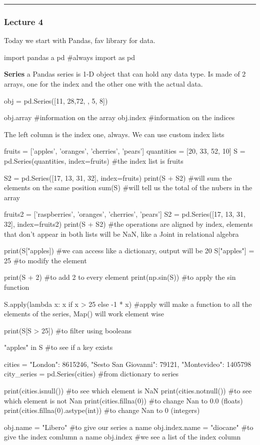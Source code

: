 \hrule
\subsubsection{Lecture 4}

Today we start with Pandas, fav library for data.

\begin{pythoncode}
    import pandas a pd #always import as pd
\end{pythoncode}

\textbf{Series} \ra a Pandas series is 1-D object that can hold any data type. Is made of 2 arrays, one for the index and the other one with the actual data.

\begin{pythoncode}
    obj = pd.Series([11, 28,72, , 5, 8])

    obj.array #information on the array
    obj.index #information on the indices
\end{pythoncode}

The left column is the index one, always. We can use custom index lists

\begin{pythoncode}
    fruits = ['apples', 'oranges', 'cherries', 'pears']
    quantities = [20, 33, 52, 10]
    S = pd.Series(quantities, index=fruits)
    #the index list is fruits

    S2 = pd.Series([17, 13, 31, 32], index=fruits)
    print(S + S2) #will sum the elements on the same position
    sum(S) #will tell us the total of the nubers in the array

    fruits2 = ['raspberries', 'oranges', 'cherries', 'pears']
    S2 = pd.Series([17, 13, 31, 32], index=fruits2)
    print(S + S2) #the operations are aligned by index, elements that don't appear in both lists will be NaN, like a Joint in relational algebra

    print(S["apples]) #we can access like a dictionary, output will be 20
    S["apples"] = 25 #to modify the element

    print(S + 2) #to add 2 to every element
    print(np.sin(S)) #to apply the sin function

    S.apply(lambda x: x if x > 25 else -1 * x) #apply will make a function to all the elements of the series, Map() will work element wise

    print(S[S > 25]) #to filter using booleans

    "apples" in S #to see if a key exists

    cities = {"London": 8615246,
    "Sesto San Giovanni": 79121,
    "Montevideo": 1405798}
    city_series = pd.Series(cities) #from dictionary to series

    print(cities.isnull()) #to see which element is NaN
    print(cities.notnull()) #to see which element is not Nan
    print(cities.fillna(0)) #to change Nan to 0.0 (floats)
    print(cities.fillna(0).astype(int)) #to change Nan to 0 (integers)

    obj.name = "Libero" #to give our series a name
    obj.index.name = "diocane" #to give the index comlumn a name
    obj.index #we see a list of the index column
\end{pythoncode}

